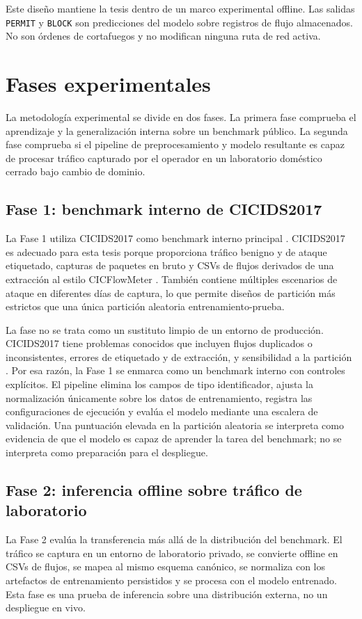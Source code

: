 Este diseño mantiene la tesis dentro de un marco experimental offline. Las salidas \texttt{PERMIT} y \texttt{BLOCK} son predicciones del modelo sobre registros de flujo almacenados. No son órdenes de cortafuegos y no modifican ninguna ruta de red activa.

\section{Fases experimentales}
La metodología experimental se divide en dos fases. La primera fase comprueba el aprendizaje y la generalización interna sobre un benchmark público. La segunda fase comprueba si el pipeline de preprocesamiento y modelo resultante es capaz de procesar tráfico capturado por el operador en un laboratorio doméstico cerrado bajo cambio de dominio.

\subsection{Fase 1: benchmark interno de CICIDS2017}
La Fase 1 utiliza CICIDS2017 como benchmark interno principal \parencite{Sharafaldin2018CICIDS2017,CICIDS2017Web}. CICIDS2017 es adecuado para esta tesis porque proporciona tráfico benigno y de ataque etiquetado, capturas de paquetes en bruto y CSVs de flujos derivados de una extracción al estilo CICFlowMeter \parencite{Lashkari2017CICFlowMeter}. También contiene múltiples escenarios de ataque en diferentes días de captura, lo que permite diseños de partición más estrictos que una única partición aleatoria entrenamiento-prueba.

La fase no se trata como un sustituto limpio de un entorno de producción. CICIDS2017 tiene problemas conocidos que incluyen flujos duplicados o inconsistentes, errores de etiquetado y de extracción, y sensibilidad a la partición \parencite{Engelen2021CICIDSIssues,Lanvin2023Errors,Liu2022ErrorPrevalenceNIDS}. Por esa razón, la Fase 1 se enmarca como un benchmark interno con controles explícitos. El pipeline elimina los campos de tipo identificador, ajusta la normalización únicamente sobre los datos de entrenamiento, registra las configuraciones de ejecución y evalúa el modelo mediante una escalera de validación. Una puntuación elevada en la partición aleatoria se interpreta como evidencia de que el modelo es capaz de aprender la tarea del benchmark; no se interpreta como preparación para el despliegue.

\subsection{Fase 2: inferencia offline sobre tráfico de laboratorio}
La Fase 2 evalúa la transferencia más allá de la distribución del benchmark. El tráfico se captura en un entorno de laboratorio privado, se convierte offline en CSVs de flujos, se mapea al mismo esquema canónico, se normaliza con los artefactos de entrenamiento persistidos y se procesa con el modelo entrenado. Esta fase es una prueba de inferencia sobre una distribución externa, no un despliegue en vivo.

